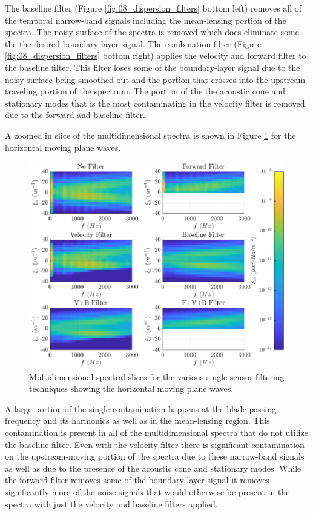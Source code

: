The baseline filter (Figure \ref{fig:08_dispersion_filters} bottom left) removes all of the temporal narrow-band signals including the mean-lensing portion of the spectra.
The noisy surface of the spectra is removed which does eliminate some the the desired boundary-layer signal.
The combination filter (Figure \ref{fig:08_dispersion_filters} bottom right) applies the velocity and forward filter to the baseline filter.
This filter loses some of the boundary-layer signal due to the noisy surface being smoothed out and the portion that crosses into the upstream-traveling portion of the spectrum.
The portion of the the acoustic cone and stationary modes that is the most contaminating in the velocity filter is removed due to the forward and baseline filter.

A zoomed in slice of the multidimensional spectra is shown in Figure \ref{fig:08_dispersion_filters_slices} for the horizontal moving plane waves.
\begin{figure}
  \centering
  \includegraphics{../matlab/08_conclusion/dispersion_filters_slices.eps}
  \caption{Multidimensional spectral slices for the various single sensor filtering techniques showing the horizontal moving plane waves.}
  \label{fig:08_dispersion_filters_slices}
\end{figure}
A large portion of the single contamination happens at the blade-passing frequency and its harmonics as well as in the mean-lensing region.
This contamination is present in all of the multidimensional spectra that do not utilize the baseline filter.
Even with the velocity filter there is significant contamination on the upstream-moving portion of the spectra due to these narrow-band signals as well as due to the presence of the acoustic cone and stationary modes.
While the forward filter removes some of the boundary-layer signal it removes significantly more of the noise signals that would otherwise be present in the spectra with just the velocity and baseline filters applied.

